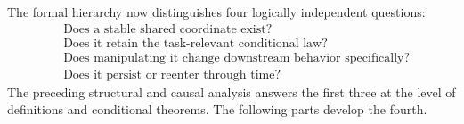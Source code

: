 \begin{remark}
The formal hierarchy now distinguishes four logically independent questions:
\[
\begin{aligned}
&\text{Does a stable shared coordinate exist?}\\
&\text{Does it retain the task-relevant conditional law?}\\
&\text{Does manipulating it change downstream behavior specifically?}\\
&\text{Does it persist or reenter through time?}
\end{aligned}
\]
The preceding structural and causal analysis answers the first three at the level of definitions and conditional
theorems. The following parts develop the fourth.
\end{remark}
